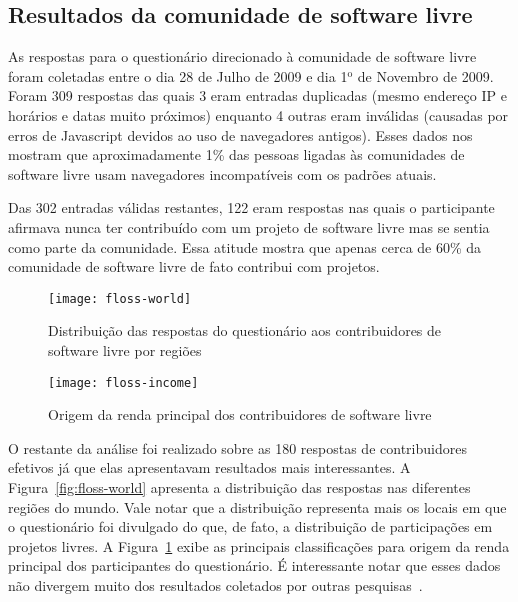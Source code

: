 \subsection{Resultados da comunidade de software livre}
\label{sec:resp-floss}

As respostas para o questionário direcionado à comunidade de software
livre foram coletadas entre o dia 28 de Julho de 2009 e dia
1$^\textrm{o}$ de Novembro de 2009. Foram 309 respostas das quais 3
eram entradas duplicadas (mesmo endereço IP e horários e datas muito
próximos) enquanto 4 outras eram inválidas (causadas por erros de
Javascript devidos ao uso de navegadores antigos). Esses dados nos
mostram que aproximadamente 1\% das pessoas ligadas às comunidades de
software livre usam navegadores incompatíveis com os padrões atuais.

Das 302 entradas válidas restantes, 122 eram respostas nas quais o
participante afirmava nunca ter contribuído com um projeto de software
livre mas se sentia como parte da comunidade. Essa atitude mostra que
apenas cerca de 60\% da comunidade de software livre de fato contribui
com projetos.


\begin{figure}[hbt]
  \begin{minipage}[t]{0.5\linewidth}
    \centering
    \texttt{[image: floss-world]}
    \caption{Distribuição das respostas do questionário aos
      contribuidores de software livre por regiões}
    \label{fig:floss-world}
  \end{minipage}
  \begin{minipage}[t]{0.5\linewidth}
    \centering
    \texttt{[image: floss-income]}
    \caption{Origem da renda principal dos contribuidores de software
      livre}
    \label{fig:floss-income}
  \end{minipage}
\end{figure}

O restante da análise foi realizado sobre as 180 respostas de
contribuidores efetivos já que elas apresentavam resultados mais
interessantes. A Figura~\ref{fig:floss-world} apresenta a distribuição
das respostas nas diferentes regiões do mundo. Vale notar que a
distribuição representa mais os locais em que o questionário foi
divulgado do que, de fato, a distribuição de participações em projetos
livres. A Figura~\ref{fig:floss-income} exibe as principais
classificações para origem da renda principal dos participantes do
questionário. É interessante notar que esses dados não divergem muito
dos resultados coletados por outras pesquisas~\cite{FlossStats}.

